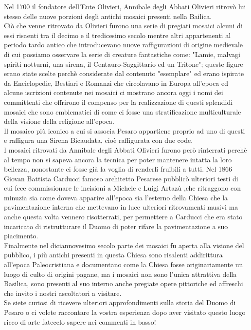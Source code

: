 \documentclass[hidelinks,12pt,a4paper]{article}
\begin{document}
\begin{flushleft}
		Nel 1700 il fondatore dell'Ente Olivieri, Annibale degli Abbati Olivieri ritrovò lui stesso delle nuove porzioni degli antichi mosaici presenti nella Bailica.\\
		Ciò che venne ritrovato da Olivieri furono una serie di pregiati mosaici alcuni di essi risaenti tra il decimo e il tredicesimo secolo mentre altri appartenenti al periodo tardo antico che introducevano nuove raffigurazioni di origine medievale di cui possiamo osservare la serie di creature fantastiche come: "Lamie, malvagi spiriti notturni, una sirena, il Centauro-Saggittario ed un Tritone"; queste figure erano state scelte perchè considerate dal contenuto "esemplare" ed erano ispirate da Enciclopedie, Bestiari e Romanzi che circolavano in Europa all'epoca ed alcune iscrizioni contenute nei mosaici ci mostrano ancora oggi i nomi dei committenti che offrirono il compenso per la realizzazione di questi splendidi mosaici che sono emblematici di come ci fosse una stratificazione multiculturale della visione della religione all'epoca.\\
		Il mosaico più iconico a cui si associa Pesaro appartiene proprio ad uno di questi e raffigura una Sirena Bicaudata, cioè raffigurata con due code.\\
		I mosaici ritrovati da Annibale degli Abbati Olivieri furono però rinterrati perchè al tempo non si sapeva ancora la tecnica per poter mantenere intatta la loro bellezza, nonostante ci fosse già la voglia di renderli fruibili a tutti. Nel 1866  Giovan Battista Carducci famoso architetto Pesarese pubblicò ulteriori testi di cui fece commissionare le incisioni a Michele e Luigi Artazù ,che ritraggono con minuzia sia come doveva apparire all'epoca sia l'esterno della Chiesa che la pavimentazione interna che mettevano in luce ulteriori ritrovamenti musivi ma anche questa volta vennero risotterrati, per permettere a Carducci che era stato incaricato di ristrutturare il Duomo di poter rifare la pavimentazione a suo piacimento.\\
		Finalmente nel diciannovesimo secolo parte dei mosaici fu aperta alla visione del pubblico, i più antichi presenti in questa Chiesa sono risalenti addirittura all'epoca Paleocristiana e documentano come la Chiesa fosse originariamente un luogo di culto di origini pagane, ma i mosaici non sono l'unica attrattiva della Basilica, sono presenti al suo interno anche pregiate opere pittoriche ed affreschi che invito i nostri ascoltatori a visitare.\\
		Se siete curiosi di ricevere ulteriori approfondimenti sulla storia del Duomo di Pesaro o ci volete raccontare la vostra esperienza dopo aver visitato questo luogo ricco di arte fatecelo sapere nei commenti in basso!\\

\end{flushleft}
\end{document}
